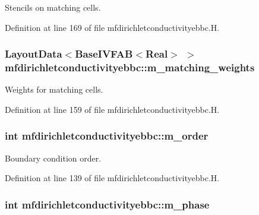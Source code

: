 Stencils on matching cells. 



Definition at line 169 of file mfdirichletconductivityebbc.\+H.

\subsubsection[{\texorpdfstring{m\+\_\+matching\+\_\+weights}{m_matching_weights}}]{\setlength{\rightskip}{0pt plus 5cm}Layout\+Data$<$Base\+I\+V\+F\+AB$<$Real$>$ $>$ mfdirichletconductivityebbc\+::m\+\_\+matching\+\_\+weights\hspace{0.3cm}{\ttfamily [protected]}}\hypertarget{classmfdirichletconductivityebbc_a31b059192cb6488ccd680b7660003623}{}\label{classmfdirichletconductivityebbc_a31b059192cb6488ccd680b7660003623}


Weights for matching cells. 



Definition at line 159 of file mfdirichletconductivityebbc.\+H.

\subsubsection[{\texorpdfstring{m\+\_\+order}{m_order}}]{\setlength{\rightskip}{0pt plus 5cm}int mfdirichletconductivityebbc\+::m\+\_\+order\hspace{0.3cm}{\ttfamily [protected]}}\hypertarget{classmfdirichletconductivityebbc_a7f14d59fdfe3df089fd969e30caff796}{}\label{classmfdirichletconductivityebbc_a7f14d59fdfe3df089fd969e30caff796}


Boundary condition order. 



Definition at line 139 of file mfdirichletconductivityebbc.\+H.

\subsubsection[{\texorpdfstring{m\+\_\+phase}{m_phase}}]{\setlength{\rightskip}{0pt plus 5cm}int mfdirichletconductivityebbc\+::m\+\_\+phase\hspace{0.3cm}{\ttfamily [protected]}}\hypertarget{classmfdirichletconductivityebbc_a450fa66f967024d39d1779e0cd53bebf}{}\label{classmfdirichletconductivityebbc_a450fa66f967024d39d1779e0cd53bebf}


